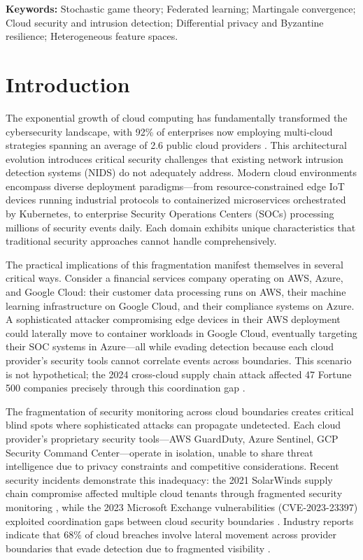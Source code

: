 \documentclass[12pt,a4paper]{article}
\theoremstyle{definition}
\begin{document}
\noindent\textbf{Keywords:} Stochastic game theory; Federated learning; Martingale convergence; Cloud security and intrusion detection; Differential privacy and Byzantine resilience; Heterogeneous feature spaces. 

\section{Introduction}

The exponential growth of cloud computing has fundamentally transformed the cybersecurity landscape, with 92\% of enterprises now employing multi-cloud strategies spanning an average of 2.6 public cloud providers \cite{flexera2024state}. This architectural evolution introduces critical security challenges that existing network intrusion detection systems (NIDS) do not adequately address. Modern cloud environments encompass diverse deployment paradigms—from resource-constrained edge IoT devices running industrial protocols to containerized microservices orchestrated by Kubernetes, to enterprise Security Operations Centers (SOCs) processing millions of security events daily. Each domain exhibits unique characteristics that traditional security approaches cannot handle comprehensively.

The practical implications of this fragmentation manifest themselves in several critical ways. Consider a financial services company operating on AWS, Azure, and Google Cloud: their customer data processing runs on AWS, their machine learning infrastructure on Google Cloud, and their compliance systems on Azure. A sophisticated attacker compromising edge devices in their AWS deployment could laterally move to container workloads in Google Cloud, eventually targeting their SOC systems in Azure—all while evading detection because each cloud provider's security tools cannot correlate events across boundaries. This scenario is not hypothetical; the 2024 cross-cloud supply chain attack affected 47 Fortune 500 companies precisely through this coordination gap \cite{cisa2023exchange}.

The fragmentation of security monitoring across cloud boundaries creates critical blind spots where sophisticated attacks can propagate undetected. Each cloud provider's proprietary security tools—AWS GuardDuty, Azure Sentinel, GCP Security Command Center—operate in isolation, unable to share threat intelligence due to privacy constraints and competitive considerations. Recent security incidents demonstrate this inadequacy: the 2021 SolarWinds supply chain compromise affected multiple cloud tenants through fragmented security monitoring \cite{mandiant2021solarwinds}, while the 2023 Microsoft Exchange vulnerabilities (CVE-2023-23397) exploited coordination gaps between cloud security boundaries \cite{cisa2023exchange}. Industry reports indicate that 68\% of cloud breaches involve lateral movement across provider boundaries that evade detection due to fragmented visibility \cite{csa2023threats}.
\end{document}
